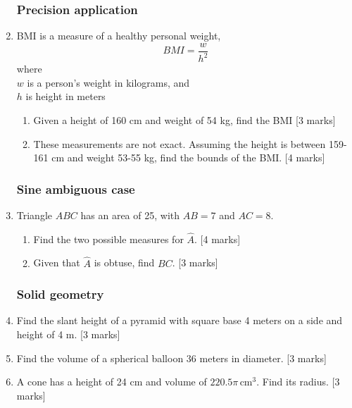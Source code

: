 \documentclass[12pt, twoside]{article}
\begin{document}
\begin{enumerate}
\subsubsection*{Precision application}
  \item BMI is a measure of a healthy personal weight, 
  \[\displaystyle BMI = \frac{w}{h^2}\]
    where \\
    $w$ is a person's weight in kilograms, and \\
    $h$ is height in meters
    \begin{enumerate} 
        \item Given a height of 160 cm and weight of 54 kg, find the BMI  \hfill [3 marks]
        \item These measurements are not exact. Assuming the height is between 159-161 cm and weight 53-55 kg, find the bounds of the BMI.  \hfill [4 marks]
      \end{enumerate}

\newpage
\subsubsection*{Sine ambiguous case}
  \item Triangle $ABC$ has an area of 25, with $AB=7$ and $AC=8$. 
  \begin{enumerate}
    \item Find the two possible measures for $\hat{A}$. \hfill [4 marks]
    \item Given that $\hat{A}$ is obtuse, find $BC$. \hfill [3 marks]
  \end{enumerate}

\newpage
\subsubsection*{Solid geometry}
\item Find the slant height of a pyramid with square base 4 meters on a side and height of 4 m. \hfill [3 marks]


  \item Find the volume of a spherical balloon 36 meters in diameter. \hfill [3 marks]
  
  \item A cone has a height of 24 cm and volume of $220.5\pi \,\mathrm{ cm}^3$. Find its radius. \hfill [3 marks]
  


\end{enumerate}
\end{document}
